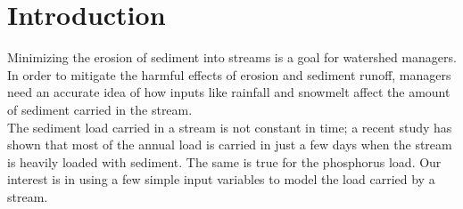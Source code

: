\section{Introduction}
Minimizing the erosion of sediment into streams is a goal for watershed managers. In order to mitigate the harmful effects of erosion and sediment runoff, managers need an accurate idea of how inputs like rainfall and snowmelt affect the amount of sediment carried in the stream.\\

The sediment load carried in a stream is not constant in time; a recent study \cite{Danz:2010} has shown that most of the annual load is carried in just a few days when the stream is heavily loaded with sediment. The same is true for the phosphorus load. Our interest is in using a few simple input variables to model the load carried by a stream.\\
